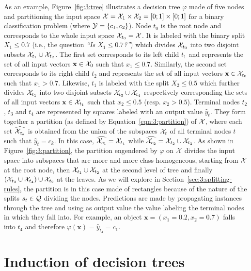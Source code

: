 As an example, Figure~\ref{fig:3:tree} illustrates a decision tree $\varphi$
made of five nodes and partitioning the input space ${\cal X} = {\cal X}_1
\times {\cal X}_2 = [0;1] \times [0; 1]$ for a binary classification problem
(where ${\cal Y}=\{ c_1, c_2 \}$). Node $t_0$ is the root node and corresponds
to the whole input space ${\cal X}_{t_0} = {\cal X}$. It is labeled with the binary
split $X_1 \leq 0.7$ (i.e., the question \textit{``Is $X_1 \leq 0.7$?''}) which divides ${\cal X}_{t_0}$ into two disjoint subsets
${\cal X}_{t_1} \cup {\cal X}_{t_2}$. The first set corresponds to its left
child $t_1$ and represents the set of all input vectors $\mathbf{x} \in {\cal
X}_0$ such that $x_1 \leq 0.7$. Similarly, the second set corresponds to its
right child $t_2$ and represents the set of all input vectors $\mathbf{x} \in
{\cal X}_{t_0}$ such that $x_1 > 0.7$. Likewise, $t_1$ is labeled with the
split $X_2 \leq 0.5$ which further divides ${\cal X}_{t_1}$ into two disjoint
subsets ${\cal X}_{t_3} \cup {\cal X}_{t_4}$ respectively corresponding the
sets of all input vectors $\mathbf{x} \in {\cal X}_{t_1}$ such that $x_2 \leq
0.5$ (resp. $x_2 > 0.5$). Terminal nodes $t_2$, $t_3$ and $t_4$ are represented
by squares labeled with an output value $\widehat{y}_t$. They form together a
partition (as defined by Equation~\ref{eqn:3:partition}) of ${\cal X}$, where
each set $\widehat{{\cal X}_{c_k}}$ is obtained from the union of the subspaces
${\cal X}_t$ of all terminal nodes $t$ such that $\widehat{y}_t = c_k$. In this
case, $\widehat{{\cal X}_{c_1}} = {\cal X}_{t_4}$ while $\widehat{{\cal
X}_{c_2}} = {\cal X}_{t_2} \cup {\cal X}_{t_3}$. As shown in
Figure~\ref{fig:3:partition}, the partition engendered by  $\varphi$ on ${\cal
X}$ divides the input space into subspaces that are more and more class
homogeneous, starting from ${\cal X}$ at the root node,  then ${\cal X}_{t_1}
\cup {\cal X}_{t_2}$ at the second level of tree and finally $({\cal X}_{t_3}
\cup {\cal X}_{t_4})\cup {\cal X}_{t_2}$ at the leaves.  As we will explore in
Section~\ref{sec:3:splitting-rules}, the partition is in this case made of
rectangles because of the nature of the splits $s_t \in {\cal Q}$ dividing the nodes.
Predictions are made by propagating instances through the tree and using as
output value the value labeling the terminal nodes in which they fall
into. For example, an object $\mathbf{x}=(x_1=0.2, x_2=0.7)$ falls into $t_4$
and therefore $\varphi(\mathbf{x}) = \widehat{y}_{t_4} = c_1$.

\section{Induction of decision trees}
\label{sec:3:induction}

